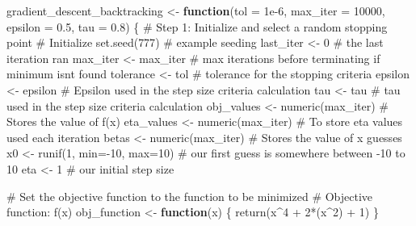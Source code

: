 \documentclass[
  letterpaper,
  DIV=11,
  numbers=noendperiod]{scrartcl}
\newenvironment{Shaded}{\begin{snugshade}}{\end{snugshade}}
\newcommand{\AttributeTok}[1]{\textcolor[rgb]{0.40,0.45,0.13}{#1}}
\newcommand{\CommentTok}[1]{\textcolor[rgb]{0.37,0.37,0.37}{#1}}
\newcommand{\ControlFlowTok}[1]{\textcolor[rgb]{0.00,0.23,0.31}{\textbf{#1}}}
\newcommand{\DecValTok}[1]{\textcolor[rgb]{0.68,0.00,0.00}{#1}}
\newcommand{\FloatTok}[1]{\textcolor[rgb]{0.68,0.00,0.00}{#1}}
\newcommand{\FunctionTok}[1]{\textcolor[rgb]{0.28,0.35,0.67}{#1}}
\newcommand{\NormalTok}[1]{\textcolor[rgb]{0.00,0.23,0.31}{#1}}
\newcommand{\OtherTok}[1]{\textcolor[rgb]{0.00,0.23,0.31}{#1}}
\newcommand{\SpecialCharTok}[1]{\textcolor[rgb]{0.37,0.37,0.37}{#1}}
\begin{document}
\begin{Shaded}
\begin{Highlighting}[]
\NormalTok{gradient\_descent\_backtracking }\OtherTok{\textless{}{-}} \ControlFlowTok{function}\NormalTok{(}\AttributeTok{tol =} \FloatTok{1e{-}6}\NormalTok{, }\AttributeTok{max\_iter =} \DecValTok{10000}\NormalTok{, }\AttributeTok{epsilon =} \FloatTok{0.5}\NormalTok{, }\AttributeTok{tau =} \FloatTok{0.8}\NormalTok{) \{}
  \CommentTok{\# Step 1: Initialize and select a random stopping point}
  \CommentTok{\# Initialize}
  \FunctionTok{set.seed}\NormalTok{(}\DecValTok{777}\NormalTok{) }\CommentTok{\# example seeding }
\NormalTok{  last\_iter }\OtherTok{\textless{}{-}} \DecValTok{0} \CommentTok{\# the last iteration ran}
\NormalTok{  max\_iter }\OtherTok{\textless{}{-}}\NormalTok{ max\_iter }\CommentTok{\# max iterations before terminating if minimum isn\textquotesingle{}t found}
\NormalTok{  tolerance }\OtherTok{\textless{}{-}}\NormalTok{ tol }\CommentTok{\# tolerance for the stopping criteria }
\NormalTok{  epsilon }\OtherTok{\textless{}{-}}\NormalTok{ epsilon }\CommentTok{\# Epsilon used in the step size criteria calculation}
\NormalTok{  tau }\OtherTok{\textless{}{-}}\NormalTok{ tau }\CommentTok{\# tau used in the step size criteria calculation}
\NormalTok{  obj\_values }\OtherTok{\textless{}{-}} \FunctionTok{numeric}\NormalTok{(max\_iter) }\CommentTok{\# Stores the value of f(x)}
\NormalTok{  eta\_values }\OtherTok{\textless{}{-}} \FunctionTok{numeric}\NormalTok{(max\_iter)  }\CommentTok{\# To store eta values used each iteration}
\NormalTok{  betas }\OtherTok{\textless{}{-}} \FunctionTok{numeric}\NormalTok{(max\_iter) }\CommentTok{\# Stores the value of x guesses}
\NormalTok{  x0 }\OtherTok{\textless{}{-}} \FunctionTok{runif}\NormalTok{(}\DecValTok{1}\NormalTok{, }\AttributeTok{min=}\SpecialCharTok{{-}}\DecValTok{10}\NormalTok{, }\AttributeTok{max=}\DecValTok{10}\NormalTok{) }\CommentTok{\# our first guess is somewhere between {-}10 to 10}
\NormalTok{  eta }\OtherTok{\textless{}{-}} \DecValTok{1} \CommentTok{\# our initial step size}
  
    \CommentTok{\# Set the objective function to the function to be minimized }
  \CommentTok{\# Objective function: f(x)}
\NormalTok{  obj\_function }\OtherTok{\textless{}{-}} \ControlFlowTok{function}\NormalTok{(x) \{}
    \FunctionTok{return}\NormalTok{(x}\SpecialCharTok{\^{}}\DecValTok{4} \SpecialCharTok{+} \DecValTok{2}\SpecialCharTok{*}\NormalTok{(x}\SpecialCharTok{\^{}}\DecValTok{2}\NormalTok{) }\SpecialCharTok{+} \DecValTok{1}\NormalTok{) }
\NormalTok{  \}}
  

\end{Highlighting}
\end{Shaded}
\end{document}
